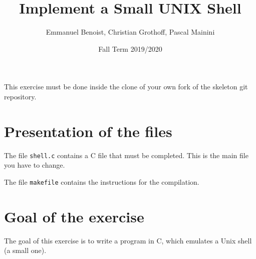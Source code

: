 \documentclass{scrartcl}
\title{Implement a Small UNIX Shell}
\author{Emmanuel Benoist, Christian Grothoff, Pascal Mainini}
\date{Fall Term 2019/2020}
\begin{document}
\maketitle

This exercise must be done inside the clone of your own fork of the skeleton git repository.

\section{Presentation of the files}



The file \texttt{shell.c} contains a C file that must be completed. This is the main file you have to change.

The file \texttt{makefile} contains the instructions for the compilation.

\section{Goal of the exercise}

The goal of this exercise is to write a program in C, which emulates a Unix shell (a small one).
\end{document}
